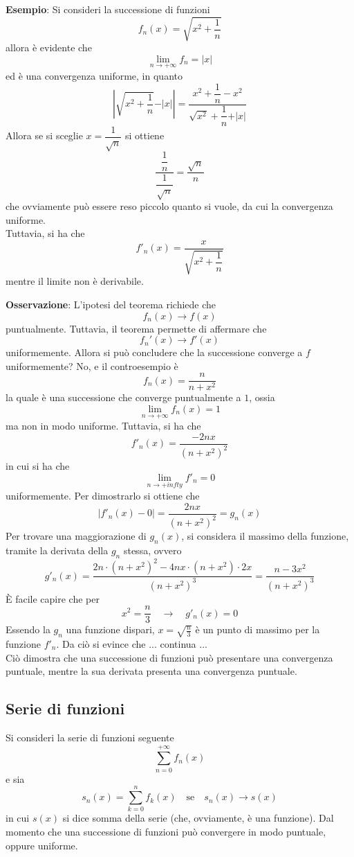 \documentclass[a4paper]{extarticle}
\begin{document}
\vspace{1em}
\noindent
\textbf{Esempio}: Si consideri la successione di funzioni
\[f_n(x) = \sqrt{x^2 + \frac{1}{n}}\]
allora è evidente che
\[\lim_{n \to +\infty} f_n = \vert x \vert\]
ed è una convergenza uniforme, in quanto
\[\left \vert \sqrt{x^2 + \frac{1}{n}} - \vert x \vert \right \vert = \dfrac{x^2 + \dfrac{1}{n} - x^2}{\sqrt{x^2} + \dfrac{1}{n} + \vert x \vert}\]
Allora se si sceglie $x=\dfrac{1}{\sqrt{n}}$ si ottiene
\[\dfrac{\dfrac{1}{n}}{\dfrac{1}{\sqrt{n}}} = \frac{\sqrt{n}}{n}\]
che ovviamente può essere reso piccolo quanto si vuole, da cui la convergenza uniforme.\\
Tuttavia, si ha che
\[f'_n(x) = \dfrac{x}{\sqrt{x^2 + \dfrac{1}{n}}}\]
mentre il limite non è derivabile.

\vspace{1em}
\noindent
\textbf{Osservazione}: L'ipotesi del teorema richiede che
\[f_n(x) \to f(x)\]
puntualmente. Tuttavia, il teorema permette di affermare che
\[f_n'(x) \to f'(x)\]
uniformemente. Allora si può concludere che la successione converge a $f$ uniformemente? No, e il controesempio è
\[f_n(x) = \frac{n}{n+x^2}\]
la quale è una successione che converge puntualmente a $1$, ossia
\[\lim_{n \to +\infty} f_n(x) = 1\]
ma non in modo uniforme. Tuttavia, si ha che
\[f'_n(x) = \frac{-2nx}{(n+x^2)^2}\]
in cui si ha che
\[\lim_{n \to +infty} f'_n = 0\]
uniformemente. Per dimostrarlo si ottiene che
\[\left \vert f'_n(x) - 0 \right \vert = \frac{2nx}{(n+x^2)^2} = g_n(x)\]
Per trovare una maggiorazione di $g_n(x)$, si considera il massimo della funzione, tramite la derivata della $g_n$ stessa, ovvero
\[g'_n(x) = \frac{2n \cdot (n+x^2)^2 - 4n x \cdot (n+x^2) \cdot 2x}{(n+x^2)^3} = \frac{n-3x^2}{(n+x^2)^3}\]
È facile capire che per
\[x^2=\frac{n}{3} \hspace{1em} \rightarrow \hspace{1em} g'_n(x) = 0\]
Essendo la $g_n$ una funzione dispari, $x=\sqrt{\frac{n}{3}}$ è un punto di massimo per la funzione $f'_n$. Da ciò si evince che
... continua ...\\
Ciò dimostra che una successione di funzioni può presentare una convergenza puntuale, mentre la sua derivata presenta una convergenza puntuale.

\vspace{1em}
\noindent
\subsection{Serie di funzioni}
Si consideri la serie di funzioni seguente
\[\sum_{n=0}^{+\infty} f_n(x)\]
e sia
\[s_n(x) = \sum_{k=0}^n f_k(x) \hspace{1em} \text{se} \hspace{1em} s_n(x) \to s(x)\]
in cui $s(x)$ si dice somma della serie (che, ovviamente, è una funzione). Dal momento che una successione di funzioni può convergere in modo puntuale, oppure uniforme.
\end{document}
